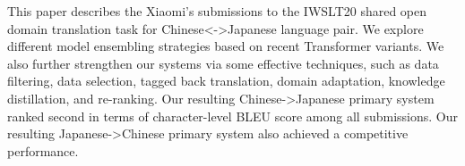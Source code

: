 This paper describes the Xiaomi's submissions to the IWSLT20 shared open domain translation task for Chinese<->Japanese language pair. We explore different model ensembling strategies based on recent Transformer variants. We also further strengthen our systems via some effective techniques, such as data filtering, data selection, tagged back translation, domain adaptation, knowledge distillation, and re-ranking. Our resulting Chinese->Japanese primary system ranked second in terms of character-level BLEU score among all submissions. Our resulting Japanese->Chinese primary system also achieved a competitive performance.
